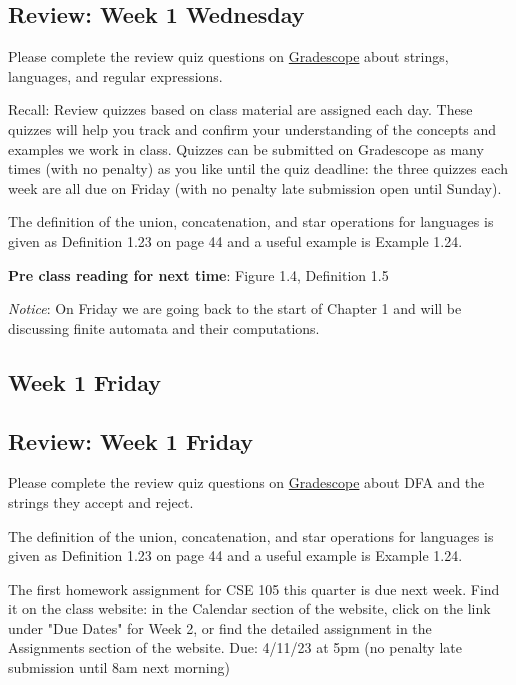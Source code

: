 \newpage
\subsection*{Review: Week 1 Wednesday}

Please complete the review quiz questions on \href{http://gradescope.com}{Gradescope} about 
strings, languages, and regular expressions.


Recall: Review quizzes based on class material are assigned each day. 
These quizzes will help you track and confirm your understanding of the concepts and examples 
we work in class. Quizzes can be submitted on Gradescope as many times (with no penalty) as 
you like until the quiz deadline: the three quizzes each week are all due on Friday (with no penalty 
late submission open until Sunday).

The definition of the union, concatenation, and star operations for languages is given 
as Definition 1.23 on page 44 and a useful example is Example 1.24.

{\bf Pre class reading for next time}: Figure 1.4, Definition 1.5

{\it Notice}: On Friday we are going back to the start of Chapter 1 and will be discussing finite 
automata and their computations.

\newpage
\subsection*{Week 1 Friday}




\newpage

\subsection*{Review: Week 1 Friday}

Please complete the review quiz questions on \href{http://gradescope.com}{Gradescope} about 
DFA and the strings they accept and reject.

The definition of the union, concatenation, and star operations for languages is given 
as Definition 1.23 on page 44 and a useful example is Example 1.24.


The first homework assignment for CSE 105 this quarter is due next week. 
Find it on the class website: in the Calendar section of the website, click on the link under "Due Dates" for Week 2, or find
the detailed assignment in the Assignments section of the website.
Due: 4/11/23 at 5pm (no penalty late submission until 8am next morning)

